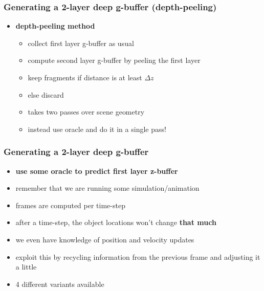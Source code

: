 \documentclass[aspectratio=169]{beamer}
\begin{document}
	\begin{frame}
		\frametitle{Generating a 2-layer deep g-buffer (depth-peeling)}
		\begin{itemize}
			\item \textbf{depth-peeling method}
				\begin{itemize}
					\item collect first layer g-buffer as usual
					\item compute second layer g-buffer by peeling the first layer
					\item keep fragments if distance is at least $\Delta z$
					\item else discard
					\item takes two passes over scene geometry\pause
					\item instead use oracle and do it in a single pass!
				\end{itemize}
		\end{itemize}
	\end{frame}	

	\begin{frame}
		\frametitle{Generating a 2-layer deep g-buffer}
		\begin{itemize}
			\item \textbf{use some oracle to predict first layer z-buffer}
			\item remember that we are running some simulation/animation
			\item frames are computed per time-step
			\item after a time-step, the object locations won't change \textbf{that much}
			\item we even have knowledge of position and velocity updates
			\item exploit this by recycling information from the previous frame and adjusting it a little
			\item 4 different variants available
		\end{itemize}
	\end{frame}	
\end{document}
